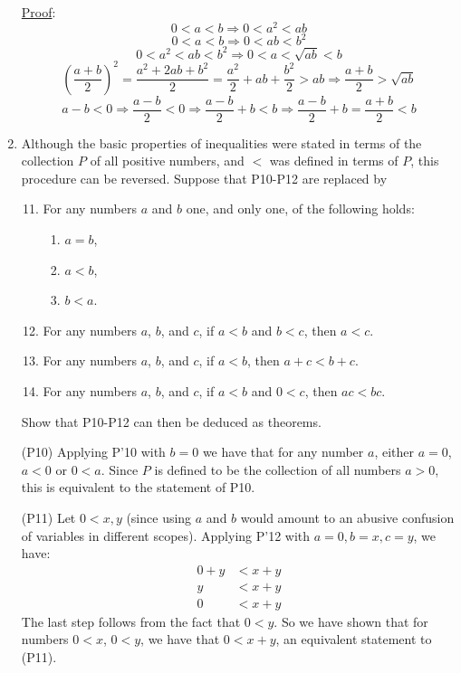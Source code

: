 \documentclass[12pt]{article}
\begin{document}
\begin{enumerate}
\underline{Proof}: $$0 < a < b \Rightarrow 0 < a^2 < ab$$
$$0 < a < b \Rightarrow 0 < ab < b^2$$
$$0 < a^2 < ab < b^2 \Rightarrow 0 < a < \sqrt{ab} < b$$
$$\left(\frac{a + b}{2}\right)^2 = \frac{a^2 + 2ab + b^2}{2} = \frac{a^2}{2} + ab + \frac{b^2}{2} > ab \Rightarrow \frac{a + b}{2} > \sqrt{ab}$$
$$a - b < 0 \Rightarrow \frac{a - b}{2} < 0 \Rightarrow \frac{a - b}{2} + b < b \Rightarrow \frac{a - b}{2} + b = \frac{a + b}{2} < b$$

\item Although the basic properties of inequalities were stated in terms of the collection $P$ of all positive numbers, and $<$ was defined in terms of $P$, this procedure can be reversed. Suppose that P10-P12 are replaced by
\begin{enumerate}[label=(P'\arabic*)]
\setcounter{enumii}{10}
\item For any numbers $a$ and $b$ one, and only one, of the following holds:
\begin{enumerate}[label=(\roman*)]
\item $a=b$,
\item $a<b$,
\item $b<a$.
\end{enumerate}
\item For any numbers $a$, $b$, and $c$, if $a<b$ and $b<c$, then $a<c$.
\item For any numbers $a$, $b$, and $c$, if $a<b$, then $a+c<b+c$.
\item For any numbers $a$, $b$, and $c$, if $a<b$ and $0<c$, then $ac<bc$.
\end{enumerate}
Show that P10-P12 can then be deduced as theorems.

(P10) Applying P'10 with $b=0$ we have that for any number $a$, either $a=0$, $a<0$ or $0<a$. Since $P$ is defined to be the collection of all numbers $a>0$, this is equivalent to the statement of P10.

(P11) Let $0<x,y$ (since using $a$ and $b$ would amount to an abusive confusion of variables in different scopes). Applying P'12 with $a=0, b=x, c=y$, we have:
\begin{align}
		0 + y &< x + y \tag{P'12}\\
             y &< x + y \tag{P2}\\
		0 &< x + y \tag{P'11}
\end{align}
The last step follows from the fact that $0<y$. So we have shown that for numbers $0<x$, $0<y$, we have that $0<x+y$, an equivalent statement to (P11).


\end{enumerate}
\end{document}

